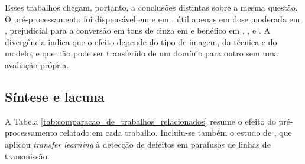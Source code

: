 Esses trabalhos chegam, portanto, a conclusões distintas sobre a mesma questão. O pré-processamento foi dispensável em  e em , útil apenas em dose moderada em , prejudicial para a conversão em tons de cinza em  e benéfico em , ,  e . A divergência indica que o efeito depende do tipo de imagem, da técnica e do modelo, e que não pode ser transferido de um domínio para outro sem uma avaliação própria.

\subsection{Síntese e lacuna}

A Tabela \ref{tab:comparacao_de_trabalhos_relacionados} resume o efeito do pré-processamento relatado em cada trabalho. Incluiu-se também o estudo de , que aplicou \textit{transfer learning} à detecção de defeitos em parafusos de linhas de transmissão.

